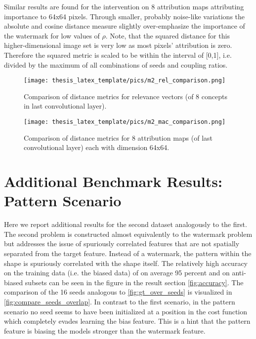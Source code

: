 Similar results are found for the intervention on 8 attribution maps attributing importance to 64x64 pixels. 
Through smaller, probably noise-like variations the absolute and cosine distance measure slightly over-emphasize the importance of the watermark for low values of $\rho$. Note, that the squared distance for this higher-dimensional image set is very low as most pixels' attribution is zero. Therefore the squared metric is scaled to be within the interval of [0,1], i.e. divided by the maximum of all combinations of seeds and coupling ratios. 

\begin{figure}
    \centering
    \texttt{[image: thesis\_latex\_template/pics/m2\_rel\_comparison.png]}
    \caption[Relevance Vector, Comparison of Metrics]{Comparison of distance metrics for relevance vectors (of 8 concepts in last convolutional layer).}
    \label{fig:m2_rel_comparison}
\end{figure}

\begin{figure}
    \centering
    \texttt{[image: thesis\_latex\_template/pics/m2\_mac\_comparison.png]}
    \caption[Attribution Maps, Comparison of Metrics]{Comparison of distance metrics for 8 attribution maps (of last convolutional layer) each with dimension 64x64.}
    \label{fig:m2_mac_comparison}
\end{figure}


\section{Additional Benchmark Results: Pattern Scenario}\label{appendix:pattern_scenario}
Here we report additional results for the second dataset analogously to the first.
The second problem is constructed almost equivalently to the watermark problem but addresses the issue of spuriously correlated features that are not spatially separated from the target feature.
Instead of a watermark, the pattern within the shape is spuriously correlated with the shape itself. 
The relatively high accuracy on the training data (i.e. the biased data) of on average 95 percent and on anti-biased subsets can be seen in the figure in the result section \cref{fig:accuracy}.
The comparison of the 16 seeds analogous to \cref{fig:gt_over_seeds} is visualized in 
\cref{fig:compare_seeds_overlap}. In contrast to the first scenario, in the pattern scenario no seed seems to have been initialized at a position in the cost function which completely evades learning the bias feature.
This is a hint that the pattern feature is biasing the models stronger than the watermark feature.

